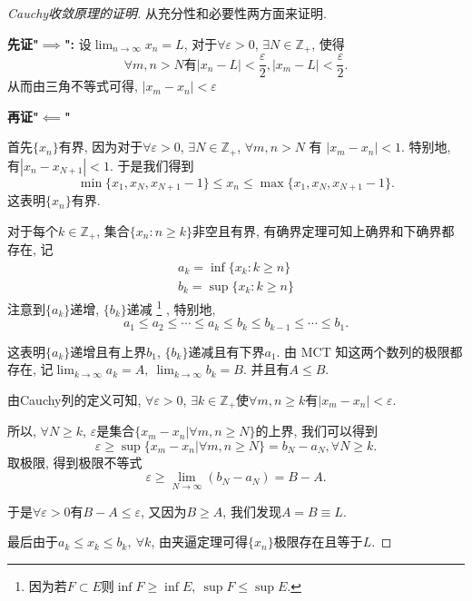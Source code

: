 \begin{proof}[Cauchy收敛原理的证明]
    从充分性和必要性两方面来证明.

    \textbf{先证"$\implies$":}
    设$\displaystyle \lim_{n \to \infty}x_n = L$, 对于$\forall  \varepsilon >0$, $\exists N \in \mathbb{Z}_{+}$, 使得
    \begin{equation}
      \forall m,n >N \text{有} |x_n-L|<\frac{\varepsilon}{2}, |x_m-L|<\frac{\varepsilon}{2}.
    \end{equation}
    从而由三角不等式可得, $|x_m - x_n|<\varepsilon$

    \textbf{再证"$\impliedby$"}

    首先$\{ x_n \}$有界, 因为对于$\forall \varepsilon>0$, $\exists N \in \mathbb{Z}_{+}$, $\forall m,n >N$ 有 $|x_m-x_n|<1$.
    特别地, 有$|x_{n}-x_{N+1}|<1$. 于是我们得到
    \begin{equation}
      \min\{ x_1,x_N, x_{N+1}-1 \} \le x_n \le \max \{ x_1, x_N, x_{N+1}-1 \}.
    \end{equation}
    这表明$\{ x_n \}$有界.

    对于每个$k\in \mathbb{Z}_{+}$, 集合$\{ x_n \colon n\ge k \}$非空且有界, 有确界定理可知上确界和下确界都存在, 记
    \begin{gather}
        a_k = \inf \{ x_k \colon k\ge n \}
        \\
        b_k = \sup \{ x_k \colon k\ge n \}
    \end{gather}
    注意到$\{ a_k \}$递增, $\{ b_k \}$递减
    \footnote{因为若$F \subset E$则$\inf F \ge  \inf E, \ \sup F \le \sup E$.}
    , 特别地,
    \begin{equation}
      a_1\le a_2\le \cdots \le a_k \le b_k \le b_{k-1} \le \cdots \le b_1.
    \end{equation}

    这表明$\{ a_k \}$递增且有上界$b_1$, $\{ b_k \}$递减且有下界$a_1$.
    由 MCT 知这两个数列的极限都存在, 记$\displaystyle \lim_{k \to \infty}a_k = A ,\ \lim_{k \to \infty} b_k = B$. 并且有$A \le B$.

    由Cauchy列的定义可知, $\forall  \varepsilon > 0$, $\exists k \in \mathbb{Z}_{+}$使$\forall m,n \ge  k$有$|x_m -x_n|< \varepsilon$.
    
    所以, $\forall N \ge k$, $\varepsilon$是集合$\{ x_m -x_n | \forall m,n \ge  N \}$的上界, 我们可以得到
    \begin{equation}
      \varepsilon \ge \sup \{ x_m -x_n | \forall  m,n\ge N \} = b_N - a_N , \forall 
      N \ge  k.
    \end{equation}
    取极限, 得到极限不等式
    \begin{equation}
      \varepsilon \ge \lim_{N \to \infty} \left( b_N -a_N \right) = B -A.
    \end{equation}

    于是$\forall \varepsilon > 0$有$B-A \le  \varepsilon$, 又因为$B \ge A$, 我们发现$A=B \equiv L$.

    最后由于$a_k \le x_k \le b_k, \ \forall k$, 由夹逼定理可得$\{ x_n \}$极限存在且等于$L$.
\end{proof}